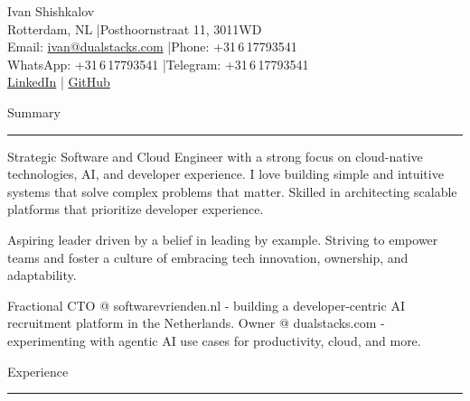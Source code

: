 \documentclass[10pt,a4paper]{article}
\newcommand{\CVSection}[1]{%
  \vspace{8pt}%
  {\headingfont\textcolor{techBlue}{#1}}\\
  \rule{\linewidth}{0.5pt}%
  \vspace{4pt}%
}
\begin{document}
\small %

{\LARGE \headingfont Ivan Shishkalov} \\
\vspace{4pt}
\textcolor{softGray}{Rotterdam, NL \quad|\quad Posthoornstraat 11, 3011WD} \\
\textcolor{softGray}{Email: \href{mailto:ivan@dualstacks.com}{ivan@dualstacks.com} 
\quad|\quad Phone: +31\,6\,17793541} \\
\textcolor{softGray}{WhatsApp: +31\,6\,17793541 \quad|\quad Telegram: +31\,6\,17793541} \\
\textcolor{softGray}{\href{https://linkedin.com/in/ivxn-sh}{LinkedIn} \quad|\quad 
\href{https://github.com/NominalTrajectory}{GitHub}} 

\CVSection{Summary}
Strategic Software and Cloud Engineer with a strong focus on cloud-native technologies, AI, and developer experience. I love building simple and intuitive systems that solve complex problems that matter. Skilled in architecting scalable platforms that prioritize developer experience. 

Aspiring leader driven by a belief in leading by example. Striving to empower teams and foster a culture of embracing tech innovation, ownership, and adaptability.

Fractional CTO @ softwarevrienden.nl - building a developer-centric AI recruitment platform in the Netherlands.
Owner @ dualstacks.com - experimenting with agentic AI use cases for productivity, cloud, and more.

\CVSection{Experience}
\end{document}
